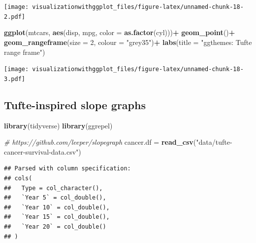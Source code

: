 \documentclass[]{krantz}
\makeatletter
\newenvironment{Shaded}{\begin{snugshade}}{\end{snugshade}}
\newcommand{\KeywordTok}[1]{\textcolor[rgb]{0.13,0.29,0.53}{\textbf{#1}}}
\newcommand{\DataTypeTok}[1]{\textcolor[rgb]{0.13,0.29,0.53}{#1}}
\newcommand{\DecValTok}[1]{\textcolor[rgb]{0.00,0.00,0.81}{#1}}
\newcommand{\StringTok}[1]{\textcolor[rgb]{0.31,0.60,0.02}{#1}}
\newcommand{\CommentTok}[1]{\textcolor[rgb]{0.56,0.35,0.01}{\textit{#1}}}
\newcommand{\OperatorTok}[1]{\textcolor[rgb]{0.81,0.36,0.00}{\textbf{#1}}}
\newcommand{\NormalTok}[1]{#1}
\newenvironment{kframe}{%
\medskip{}
\setlength{\fboxsep}{.8em}
 \def\at@end@of@kframe{}%
 \ifinner\ifhmode%
  \def\at@end@of@kframe{\end{minipage}}%
  \begin{minipage}{\columnwidth}%
 \fi\fi%
 \def\FrameCommand##1{\hskip\@totalleftmargin \hskip-\fboxsep
 \colorbox{shadecolor}{##1}\hskip-\fboxsep
     \hskip-\linewidth \hskip-\@totalleftmargin \hskip\columnwidth}%
 \MakeFramed {\advance\hsize-\width
   \@totalleftmargin\z@ \linewidth\hsize
   \@setminipage}}%
 {\par\unskip\endMakeFramed%
 \at@end@of@kframe}
\renewenvironment{Shaded}{\begin{kframe}}{\end{kframe}}
\theoremstyle{definition}
\theoremstyle{definition}
\theoremstyle{definition}
\theoremstyle{remark}
\makeatother
\begin{document}
\texttt{[image: visualizationwithggplot\_files/figure-latex/unnamed-chunk-18-2.pdf]}

\begin{Shaded}
\begin{Highlighting}[]
\KeywordTok{ggplot}\NormalTok{(mtcars, }\KeywordTok{aes}\NormalTok{(disp, mpg, }\DataTypeTok{color =} \KeywordTok{as.factor}\NormalTok{(cyl)))}\OperatorTok{+}
\KeywordTok{geom_point}\NormalTok{()}\OperatorTok{+}
\StringTok{  }\KeywordTok{geom_rangeframe}\NormalTok{(}\DataTypeTok{size =} \DecValTok{2}\NormalTok{, }\DataTypeTok{colour =} \StringTok{"grey35"}\NormalTok{)}\OperatorTok{+}
\StringTok{  }\KeywordTok{labs}\NormalTok{(}\DataTypeTok{title =} \StringTok{"ggthemes: Tufte range frame"}\NormalTok{)}
\end{Highlighting}
\end{Shaded}

\texttt{[image: visualizationwithggplot\_files/figure-latex/unnamed-chunk-18-3.pdf]}

\subsection{Tufte-inspired slope graphs}\label{tufte-slopegraph}

\begin{Shaded}
\begin{Highlighting}[]
\KeywordTok{library}\NormalTok{(tidyverse)}
\KeywordTok{library}\NormalTok{(ggrepel)}

\CommentTok{# https://github.com/leeper/slopegraph}
\NormalTok{cancer.df =}\StringTok{ }\KeywordTok{read_csv}\NormalTok{(}\StringTok{"data/tufte-cancer-survival-data.csv"}\NormalTok{)}
\end{Highlighting}
\end{Shaded}

\begin{verbatim}
## Parsed with column specification:
## cols(
##   Type = col_character(),
##   `Year 5` = col_double(),
##   `Year 10` = col_double(),
##   `Year 15` = col_double(),
##   `Year 20` = col_double()
## )
\end{verbatim}
\end{document}
